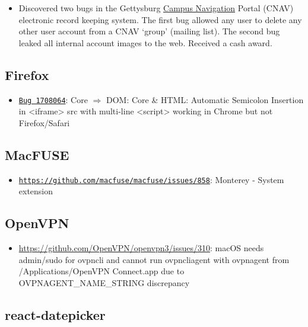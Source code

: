 \documentclass[]{article}
\begin{document}
\begin{itemize}
	\item Discovered two bugs in the Gettysburg \href{https://cnav.gettysburg.edu/}{Campus Navigation} Portal (CNAV) electronic record keeping system. The first bug allowed any user to delete any other user account from a CNAV ‘group’ (mailing list). The second bug leaked all internal account images to the web. Received a cash award.
\end{itemize}

\subsection*{Firefox}

\begin{itemize}
	\item \href{https://bugzilla.mozilla.org/show_bug.cgi?id=1708064}{\texttt{Bug 1708064}}: Core $\Rightarrow$ DOM: Core \& HTML: Automatic Semicolon Insertion in <iframe> src with multi-line <script> working in Chrome but not Firefox/Safari

\end{itemize}

\subsection*{MacFUSE}

\begin{itemize}
	\item \href{https://github.com/macfuse/macfuse/issues/858#issuecomment-1738210120}{\texttt{https://github.com/macfuse/macfuse/issues/858}}: Monterey - System extension
\end{itemize}

\subsection*{OpenVPN}

\begin{itemize}
	\item \url{https://github.com/OpenVPN/openvpn3/issues/310}: macOS needs admin/sudo for ovpncli and cannot run ovpncliagent with ovpnagent from /Applications/OpenVPN Connect.app due to OVPNAGENT\_NAME\_STRING discrepancy
\end{itemize}

\subsection*{react-datepicker}
\end{document}
